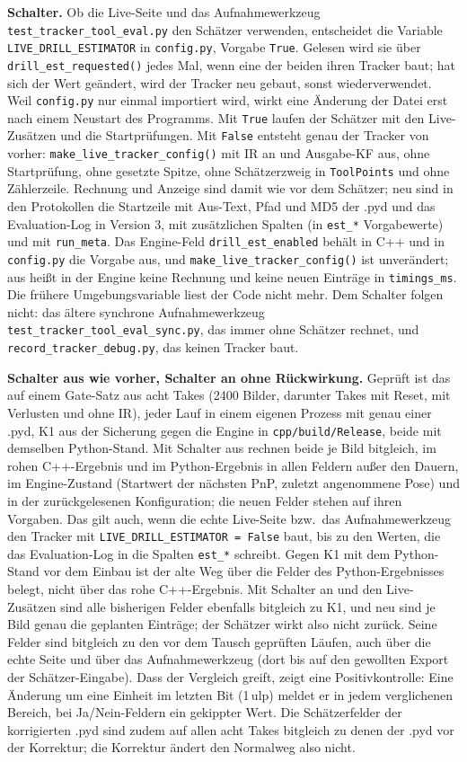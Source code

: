 \documentclass[11pt,a4paper,fleqn]{article}
\newcommand{\code}[1]{\texttt{#1}}
\begin{document}
\textbf{Schalter.} Ob die Live-Seite und das Aufnahmewerkzeug \code{test\_tracker\_tool\_eval.py} den Schätzer
verwenden, entscheidet die Variable \code{LIVE\_DRILL\_ESTIMATOR} in \code{config.py}, Vorgabe \code{True}. Gelesen
wird sie über \code{drill\_est\_requested()} jedes Mal, wenn eine der beiden ihren Tracker baut; hat sich der Wert
geändert, wird der Tracker neu gebaut, sonst wiederverwendet. Weil \code{config.py} nur einmal importiert wird, wirkt
eine Änderung der Datei erst nach einem Neustart des Programms. Mit \code{True} laufen der Schätzer mit den
Live-Zusätzen und die Startprüfungen. Mit \code{False} entsteht genau der Tracker von vorher:
\code{make\_live\_tracker\_config()} mit IR an und Ausgabe-KF aus, ohne Startprüfung, ohne gesetzte Spitze, ohne
Schätzerzweig in \code{ToolPoints} und ohne Zählerzeile. Rechnung und Anzeige sind damit wie vor dem Schätzer; neu
sind in den Protokollen die Startzeile mit Aus-Text, Pfad und MD5 der .pyd und das Evaluation-Log in Version 3, mit
zusätzlichen Spalten (in \code{est\_*} Vorgabewerte) und mit \code{run\_meta}. Das Engine-Feld
\code{drill\_est\_enabled} behält in C++ und in \code{config.py} die Vorgabe
aus, und \code{make\_live\_tracker\_config()} ist unverändert; aus heißt in der Engine keine Rechnung und keine neuen
Einträge in \code{timings\_ms}. Die frühere Umgebungsvariable liest der Code nicht mehr. Dem
Schalter folgen nicht: das ältere synchrone Aufnahmewerkzeug \code{test\_tracker\_tool\_eval\_sync.py}, das immer ohne
Schätzer rechnet, und \code{record\_tracker\_debug.py}, das keinen Tracker baut.

\textbf{Schalter aus wie vorher, Schalter an ohne Rückwirkung.} Geprüft ist das auf einem Gate-Satz aus acht Takes
(2400 Bilder, darunter Takes mit Reset, mit Verlusten und ohne IR), jeder Lauf in einem eigenen Prozess mit genau
einer .pyd, K1 aus der Sicherung gegen die Engine in \code{cpp/build/Release}, beide mit demselben Python-Stand. Mit
Schalter aus rechnen beide je Bild bitgleich, im rohen C++-Ergebnis und im Python-Ergebnis in allen Feldern außer den
Dauern, im Engine-Zustand (Startwert der nächsten PnP, zuletzt angenommene Pose) und in der zurückgelesenen
Konfiguration; die neuen Felder stehen auf ihren Vorgaben. Das gilt auch, wenn die echte Live-Seite bzw.\ das
Aufnahmewerkzeug den Tracker mit \code{LIVE\_DRILL\_ESTIMATOR = False} baut, bis zu den Werten, die das
Evaluation-Log in die Spalten \code{est\_*} schreibt. Gegen K1 mit dem Python-Stand vor dem Einbau ist der alte Weg
über die Felder des Python-Ergebnisses belegt, nicht über das rohe C++-Ergebnis. Mit Schalter an und den
Live-Zusätzen sind alle bisherigen Felder ebenfalls bitgleich zu K1, und neu sind je Bild genau die geplanten
Einträge; der Schätzer wirkt also nicht zurück. Seine Felder sind bitgleich zu den vor dem Tausch geprüften Läufen,
auch über die echte Seite und über das Aufnahmewerkzeug (dort bis auf den gewollten Export der Schätzer-Eingabe). Dass
der Vergleich greift, zeigt eine Positivkontrolle: Eine Änderung um eine Einheit im letzten Bit (1\,ulp) meldet er in
jedem verglichenen Bereich, bei Ja/Nein-Feldern ein gekippter Wert. Die Schätzerfelder der korrigierten .pyd sind zudem auf allen acht Takes bitgleich zu
denen der .pyd vor der Korrektur; die Korrektur ändert den Normalweg also nicht.
\end{document}
